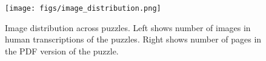 \begin{figure}[h]
\centering
\texttt{[image: figs/image\_distribution.png]}
\caption{Image distribution across puzzles. Left shows number of images in human transcriptions of the puzzles. Right shows number of pages in the PDF version of the puzzle.}
\label{fig:image_distribution}
\vspace{-2pt}
\end{figure}